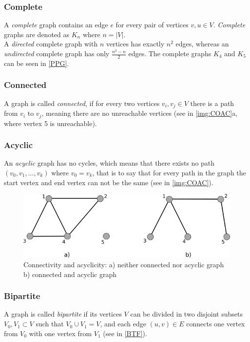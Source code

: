 \subsubsection{Complete} 
A \textit{complete} graph contains an edge $e$ for every pair of vertices $v, u \in V$. \textit{Complete} graphs are denoted as $K_n$ where $n = |V|$.\\
A \textit{directed} complete graph with $n$ vertices has exactly $n^2$ edges, whereas an \textit{undirected} complete graph has only $\frac{n^2 -n}{2}$ edges. The complete graphs $K_4$ and $K_5$ can be seen in \autoref{PPG}.
\subsubsection{Connected}
A graph is called \textit{connected}, if for every two vertices $v_i, v_j \in V$ there is a path from $v_i$ to $v_j$, meaning there are no unreachable vertices (see in \autoref{img:COAC}a, where vertex 5 is unreachable).
\subsubsection{Acyclic}
An \textit{acyclic} graph has no cycles, which means that there exists no path $(v_0, v_1,...,v_k)$ where $v_0 = v_k$, that is to say that for every path in the graph the start vertex and end vertex can not be the same (see in \autoref{img:COAC}).
\begin{figure}[h!]
\begin{center}
\includegraphics[width= \textwidth]{figures/ConnectedAcyclic.png}
\caption{Connectivity and acyclicity: a) neither connected nor acyclic graph b) connected and acyclic graph}
\label{img:COAC}
\end{center}
\end{figure}
\subsubsection{Bipartite}
A graph is called \textit{bipartite} if its vertices $V$ can be divided in two disjoint subsets $V_0, V_1 \subset V$ such that $V_0 \cup V_1 = V$, and each edge $(u,v) \in E$ connects one vertex from $V_0$ with one vertex from $V_1$ (see in \autoref{BTF}).\\
